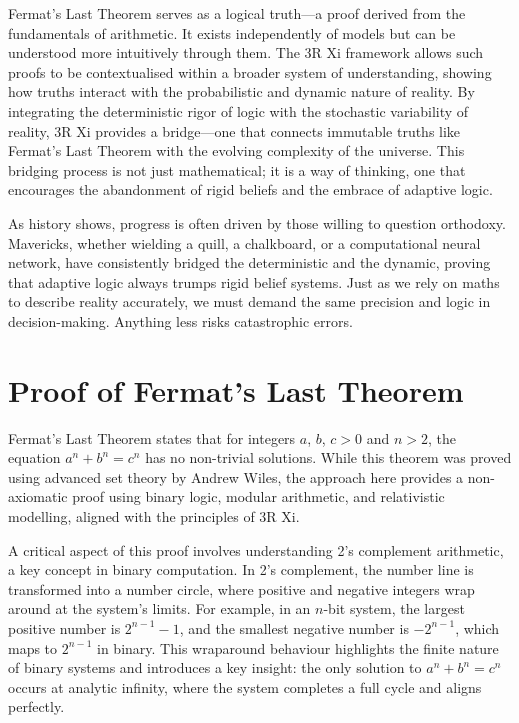 \documentclass[12pt]{article}
\begin{document}
Fermat’s Last Theorem serves as a logical truth—a proof derived from the fundamentals of arithmetic. It exists independently of models but can be understood more intuitively through them. The 3R Xi framework allows such proofs to be contextualised within a broader system of understanding, showing how truths interact with the probabilistic and dynamic nature of reality. By integrating the deterministic rigor of logic with the stochastic variability of reality, 3R Xi provides a bridge—one that connects immutable truths like Fermat’s Last Theorem with the evolving complexity of the universe. This bridging process is not just mathematical; it is a way of thinking, one that encourages the abandonment of rigid beliefs and the embrace of adaptive logic.

As history shows, progress is often driven by those willing to question orthodoxy. Mavericks, whether wielding a quill, a chalkboard, or a computational neural network, have consistently bridged the deterministic and the dynamic, proving that adaptive logic always trumps rigid belief systems. Just as we rely on maths to describe reality accurately, we must demand the same precision and logic in decision-making. Anything less risks catastrophic errors.

\section*{Proof of Fermat’s Last Theorem}

Fermat’s Last Theorem states that for integers \(a\), \(b\), \(c > 0\) and \(n > 2\), the equation \(a^n + b^n = c^n\) has no non-trivial solutions. While this theorem was proved using advanced set theory by Andrew Wiles, the approach here provides a non-axiomatic proof using binary logic, modular arithmetic, and relativistic modelling, aligned with the principles of 3R Xi.

A critical aspect of this proof involves understanding 2’s complement arithmetic, a key concept in binary computation. In 2’s complement, the number line is transformed into a number circle, where positive and negative integers wrap around at the system’s limits. For example, in an \(n\)-bit system, the largest positive number is \(2^{n-1} - 1\), and the smallest negative number is \(-2^{n-1}\), which maps to \(2^{n-1}\) in binary. This wraparound behaviour highlights the finite nature of binary systems and introduces a key insight: the only solution to \(a^n + b^n = c^n\) occurs at analytic infinity, where the system completes a full cycle and aligns perfectly.
\end{document}
